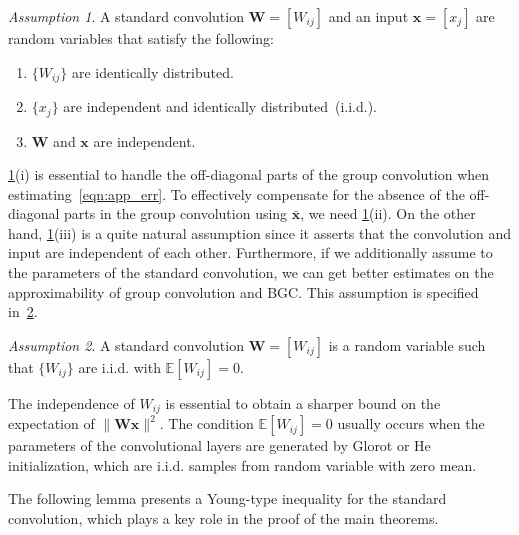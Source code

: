 \documentclass[10pt,a4paper]{amsart}
\numberwithin{equation}{section}
\theoremstyle{remark}
\newtheorem{assumption}[assumption]{Assumption}
\newcommand\bW{\mathbf{W}}
\newcommand\bx{\mathbf{x}}
\newcommand\bbE{\mathbb{E}}
\begin{document}
\begin{assumption}
\label{ass:data}
A standard convolution $\bW = [W_{ij}]$ and an input $\bx = [x_{j}]$ are random variables that satisfy the following:
\begin{enumerate}[label=(\roman*)]
    \item $\{ W_{ij} \}$ are identically distributed.
    \item $\{ x_{j} \}$ are independent and identically distributed~(i.i.d.).
    \item $\bW$ and $\bx$ are independent.
\end{enumerate}
\end{assumption}
\cref{ass:data}(i) is essential to handle the off-diagonal parts of the group convolution when estimating~\eqref{eqn:app_err}.
To effectively compensate for the absence of the off-diagonal parts in the group convolution using $\bar{\bx}$, we need \cref{ass:data}(ii).
On the other hand, \cref{ass:data}(iii) is a quite natural assumption since it asserts that the convolution and input are independent of each other.
Furthermore, if we additionally assume to the parameters of the standard convolution, we can get better estimates on the approximability of group convolution and BGC.
This assumption is specified in~\cref{ass:input}.
\begin{assumption}
\label{ass:input}
A standard convolution $\bW = [W_{ij}]$ is a random variable such that $\{ W_{ij} \}$ are i.i.d. with $\bbE [ W_{ij} ] = 0$.
\end{assumption}
The independence of $W_{ij}$ is essential to obtain a sharper bound on the expectation of $\| \bW\bx \|^{2}$.
The condition $\bbE [ W_{ij} ] = 0$ usually occurs when the parameters of the convolutional layers are generated by Glorot or He initialization, which are i.i.d. samples from random variable with zero mean.

The following lemma presents a Young-type inequality for the standard convolution, which plays a key role in the proof of the main theorems.
\end{document}
